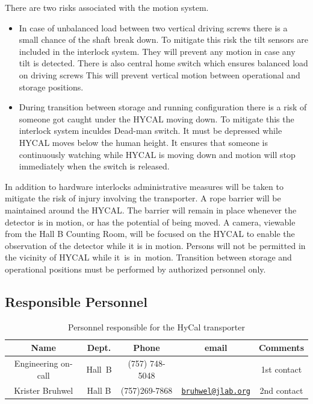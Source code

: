 There are two risks associated with the motion system.
\begin{itemize}
\item In case of unbalanced load between two vertical driving screws there is a small chance of the shaft break down. To mitigate this risk the tilt sensors are included in the interlock system. They will prevent any motion in case any tilt is detected. There is also central home switch which ensures balanced load on driving screws This will prevent vertical motion between operational and storage positions.
\item During transition between storage and running configuration there is a risk of someone got caught under the HYCAL moving down. 
To mitigate this the interlock system inculdes Dead-man switch. It must be depressed while HYCAL moves below the human height. It ensures that someone is continuously watching while HYCAL is moving down and motion will stop immediately when the switch is released.
\end{itemize}
In addition to hardware interlocks administrative measures will be taken to mitigate the risk of injury involving the transporter.
A rope barrier will be maintained around the HYCAL. The barrier will
remain in place whenever the detector is in motion, or has the potential of
being moved. A camera, viewable from the Hall B Counting Room, will be
focused on the HYCAL to enable the observation of the detector while it is in
motion. Persons will not be permitted in the vicinity of HYCAL while \mbox{it is in motion.} Transition between storage and operational positions must be performed by authorized personnel only.

\subsection{Responsible Personnel}
\begin{table}[!htb]
\centering
\begin{tabular}{|c|c|c|c|c|} \hline
Name&Dept.&Phone&email&Comments \\ \hline
Engineering on-call & Hall~B& (757) 748-5048&& 1st contact  \\ \hline
Krister Bruhwel & Hall B  &(757)269-7868 &\href{mailto:bruhwel@jlab.org}{\nolinkurl{bruhwel@jlab.org}}  &2nd contact \\ \hline
 \end{tabular}
\caption{Personnel responsible for the HyCal transporter} 
\end{table}

